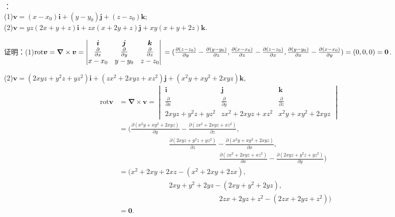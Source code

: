 \documentclass[12pt,UTF8]{ctexart}
\newcommand{\ppx}[1]{\frac{\partial #1}{\partial x}}
\newcommand{\ppy}[1]{\frac{\partial #1}{\partial y}}
\newcommand{\ppz}[1]{\frac{\partial #1}{\partial z}}
\begin{document}
\begin{enumerate}
：\\
(1)$\bm v=(x-x_0)\bm i+(y-y_0)\bm j+(z-z_0)\bm k$;\\
(2)$\bm v=yz(2x+y+z)\bm i+zx(x+2y+z)\bm j+xy(x+y+2z)\bm k$.

证明：(1)$\text{rot}\bm v=\bm\nabla\times\bm v=\begin{vmatrix}
\bm i&\bm j&\bm k\\
\ppx{}&\ppy{}&\ppz{}\\
x-x_0&y-y_0&z-z_0
\end{vmatrix}\\
=(\ppy{(z-z_0)}-\ppz{(y-y_0)},\ppz{(x-x_0)}-\ppx{(z-z_0)},\ppx{(y-y_0)}-\ppy{(x-x_0)})=(0,0,0)=\bm0$.

(2)$\bm v=(2xyz+y^2z+yz^2)\bm i+(zx^2+2xyz+xz^2)\bm j+(x^2y+xy^2+2xyz)\bm k$,
\[\begin{aligned}
\text{rot}\bm v&=\bm\nabla\times\bm v=\begin{vmatrix}
\bm i&\bm j&\bm k\\
\ppx{}&\ppy{}&\ppz{}\\
2xyz+y^2z+yz^2&zx^2+2xyz+xz^2&x^2y+xy^2+2xyz
\end{vmatrix}\\
&=(\ppy{(x^2y+xy^2+2xyz)}-\ppz{(zx^2+2xyz+xz^2)},\\
&\hspace{3cm}\ppz{(2xyz+y^2z+yz^2)}-\ppx{(x^2y+xy^2+2xyz)},\\
&\hspace{6cm}\ppx{(zx^2+2xyz+xz^2)}-\ppy{(2xyz+y^2z+yz^2)})\\
&=(x^2+2xy+2xz-(x^2+2xy+2zx),\\
&\hspace{3cm}2xy+y^2+2yz-(2xy+y^2+2yz),\\
&\hspace{6cm}2zx+2yz+z^2-(2zx+2yz+z^2))\\
&=\bm0.
\end{aligned}\]
\end{enumerate}
\end{document}
